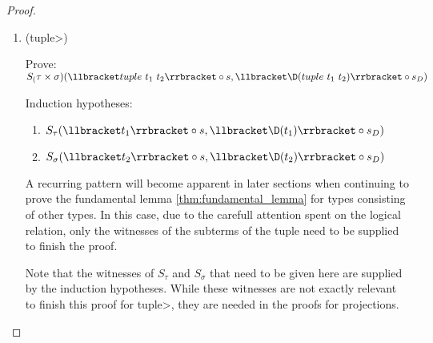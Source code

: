 \begin{proof}
\begin{enumerate}
      \item (\<tuple>)

      Prove: $S_(\tau \times \sigma)(\llbracket tuple\ t_1\ t_2 \rrbracket \circ s, \llbracket \D(tuple\ t_1\ t_2) \rrbracket \circ s_D)$

      Induction hypotheses:
      \begin{enumerate}
        \item \label{eqn:subst_ih_tuple1}$S_\tau(\llbracket t_1 \rrbracket \circ s, \llbracket \D(t_1) \rrbracket \circ s_D)$
        \item \label{eqn:subst_ih_tuple2}$S_\sigma(\llbracket t_2 \rrbracket \circ s, \llbracket \D(t_2) \rrbracket \circ s_D)$
      \end{enumerate}

      A recurring pattern will become apparent in later sections when continuing to prove the fundamental lemma \ref{thm:fundamental_lemma} for types consisting of other types.
      In this case, due to the carefull attention spent on the logical relation, only the witnesses of the subterms of the tuple need to be supplied to finish the proof.

      Note that the witnesses of $S_\tau$ and $S_\sigma$ that need to be given here are supplied by the induction hypotheses.
      While these witnesses are not exactly relevant to finish this proof for \<tuple>, they are needed in the proofs for projections.


\end{enumerate}
\end{proof}
